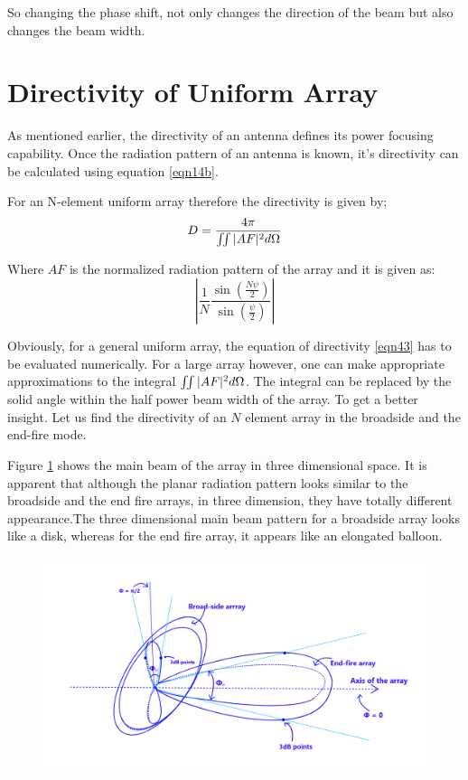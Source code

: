 So changing the phase shift, not only changes the direction of the beam but also changes the beam width. 

\section{Directivity of Uniform Array}

As mentioned earlier, the directivity of an antenna defines its power focusing capability. Once the radiation pattern of an antenna is known, it's directivity can be calculated using equation \ref{eqn14b}.

For an N-element uniform array therefore the directivity is given by;
\begin{equation}
D = \frac{4 \pi}{\iint \arrowvert AF \arrowvert^2 d \Omega}
\label{eqn43}
\end{equation}

Where $AF$ is the normalized radiation pattern of the array and it is given as:
$$
\left\vert \frac{1}{N} \frac{\sin{(\frac{N \psi}{2})}}{\sin{(\frac{ \psi}{2})}} \right\vert
$$

Obviously, for a general uniform array, the equation of directivity \ref{eqn43} has to be evaluated numerically. For a large array however, one can make appropriate approximations to the integral $\iint \arrowvert AF \arrowvert^2 d \Omega$. The integral can be replaced by the solid angle within the half power beam width of the array. To get a better insight. Let us find the directivity of an $N$ element array in the broadside and the end-fire mode.

Figure \ref{54.8} shows the main beam of the array in three dimensional space. It is apparent that although the planar radiation pattern looks similar to the broadside and the end fire arrays, in three dimension, they have totally different appearance.The three dimensional main beam pattern for a broadside array looks like a disk, whereas for the end fire array, it appears like an elongated balloon.

\begin{figure}[h]
\includegraphics[width=1\linewidth]{./graphics/fig54_5}
\centering
\caption{}
\label{54.8}
\end{figure}

